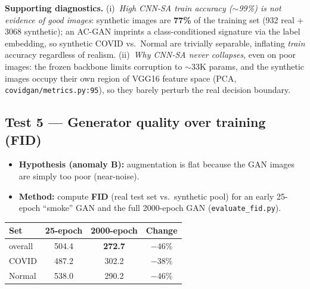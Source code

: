 \documentclass[11pt]{article}
\newcommand{\code}[1]{\texttt{#1}}
\begin{document}
\noindent\textbf{Supporting diagnostics.} (i)~\emph{High CNN-SA train accuracy
($\sim$99\%) is not evidence of good images}: synthetic images are \textbf{77\%}
of the training set (932 real + 3068 synthetic); an AC-GAN imprints a
class-conditioned signature via the label embedding, so synthetic COVID vs.\ Normal
are trivially separable, inflating \emph{train} accuracy regardless of realism.
(ii)~\emph{Why CNN-SA never collapses}, even on poor images: the frozen backbone
limits corruption to $\sim$33K params, and the synthetic images occupy their own
region of VGG16 feature space (PCA, \code{covidgan/metrics.py:95}), so they barely
perturb the real decision boundary.

\subsection{Test 5 --- Generator quality over training (FID)}
\begin{itemize}[nosep,leftmargin=1.4em]
  \item \textbf{Hypothesis (anomaly B):} augmentation is flat because the GAN
        images are simply too poor (near-noise).
  \item \textbf{Method:} compute \textbf{FID} (real test set vs.\ synthetic pool)
        for an early 25-epoch ``smoke'' GAN and the full 2000-epoch GAN
        (\code{evaluate\_fid.py}).
\end{itemize}

\begin{table}[htbp]
\centering
\begin{tabular}{@{}lccc@{}}
\toprule
\textbf{Set} & \textbf{25-epoch} & \textbf{2000-epoch} & \textbf{Change} \\
\midrule
overall & 504.4 & \textbf{272.7} & $-46\%$ \\
COVID   & 487.2 & 302.2 & $-38\%$ \\
Normal  & 538.0 & 290.2 & $-46\%$ \\
\bottomrule
\end{tabular}
\end{table}
\end{document}
